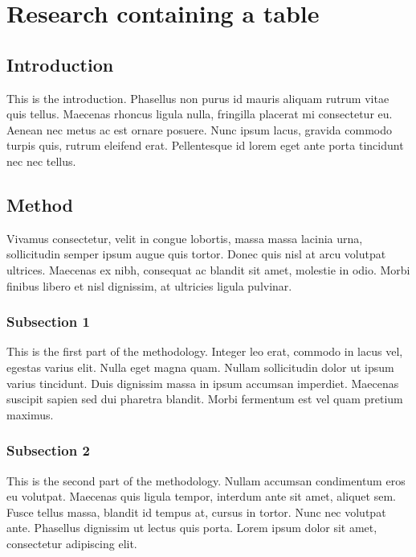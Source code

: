 \documentclass[12pt,a4paper,]{report}
\begin{document}
\hypertarget{research-containing-a-table}{%
\chapter{Research containing a
table}\label{research-containing-a-table}}

\hypertarget{introduction-3}{%
\section{Introduction}\label{introduction-3}}

This is the introduction. Phasellus non purus id mauris aliquam rutrum
vitae quis tellus. Maecenas rhoncus ligula nulla, fringilla placerat mi
consectetur eu. Aenean nec metus ac est ornare posuere. Nunc ipsum
lacus, gravida commodo turpis quis, rutrum eleifend erat. Pellentesque
id lorem eget ante porta tincidunt nec nec tellus.

\hypertarget{method-2}{%
\section{Method}\label{method-2}}

Vivamus consectetur, velit in congue lobortis, massa massa lacinia urna,
sollicitudin semper ipsum augue quis tortor. Donec quis nisl at arcu
volutpat ultrices. Maecenas ex nibh, consequat ac blandit sit amet,
molestie in odio. Morbi finibus libero et nisl dignissim, at ultricies
ligula pulvinar.

\hypertarget{subsection-1-1}{%
\subsection{Subsection 1}\label{subsection-1-1}}

This is the first part of the methodology. Integer leo erat, commodo in
lacus vel, egestas varius elit. Nulla eget magna quam. Nullam
sollicitudin dolor ut ipsum varius tincidunt. Duis dignissim massa in
ipsum accumsan imperdiet. Maecenas suscipit sapien sed dui pharetra
blandit. Morbi fermentum est vel quam pretium maximus.

\hypertarget{subsection-2-2}{%
\subsection{Subsection 2}\label{subsection-2-2}}

This is the second part of the methodology. Nullam accumsan condimentum
eros eu volutpat. Maecenas quis ligula tempor, interdum ante sit amet,
aliquet sem. Fusce tellus massa, blandit id tempus at, cursus in tortor.
Nunc nec volutpat ante. Phasellus dignissim ut lectus quis porta. Lorem
ipsum dolor sit amet, consectetur adipiscing elit.
\end{document}
